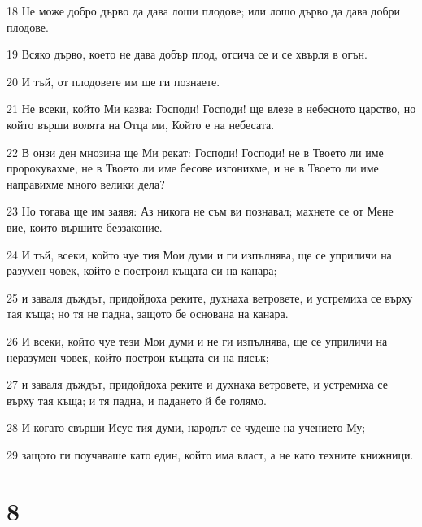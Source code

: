 \par 18 Не може добро дърво да дава лоши плодове; или лошо дърво да дава добри плодове.
\par 19 Всяко дърво, което не дава добър плод, отсича се и се хвърля в огън.
\par 20 И тъй, от плодовете им ще ги познаете.
\par 21 Не всеки, който Ми казва: Господи! Господи! ще влезе в небесното царство, но който върши волята на Отца ми, Който е на небесата.
\par 22 В онзи ден мнозина ще Ми рекат: Господи! Господи! не в Твоето ли име пророкувахме, не в Твоето ли име бесове изгонихме, и не в Твоето ли име направихме много велики дела?
\par 23 Но тогава ще им заявя: Аз никога не съм ви познавал; махнете се от Мене вие, които вършите беззаконие.
\par 24 И тъй, всеки, който чуе тия Мои думи и ги изпълнява, ще се уприличи на разумен човек, който е построил къщата си на канара;
\par 25 и заваля дъждът, придойдоха реките, духнаха ветровете, и устремиха се върху тая къща; но тя не падна, защото бе основана на канара.
\par 26 И всеки, който чуе тези Мои думи и не ги изпълнява, ще се уприличи на неразумен човек, който построи къщата си на пясък;
\par 27 и заваля дъждът, придойдоха реките и духнаха ветровете, и устремиха се върху тая къща; и тя падна, и падането й бе голямо.
\par 28 И когато свърши Исус тия думи, народът се чудеше на учението Му;
\par 29 защото ги поучаваше като един, който има власт, а не като техните книжници.

\chapter{8}

